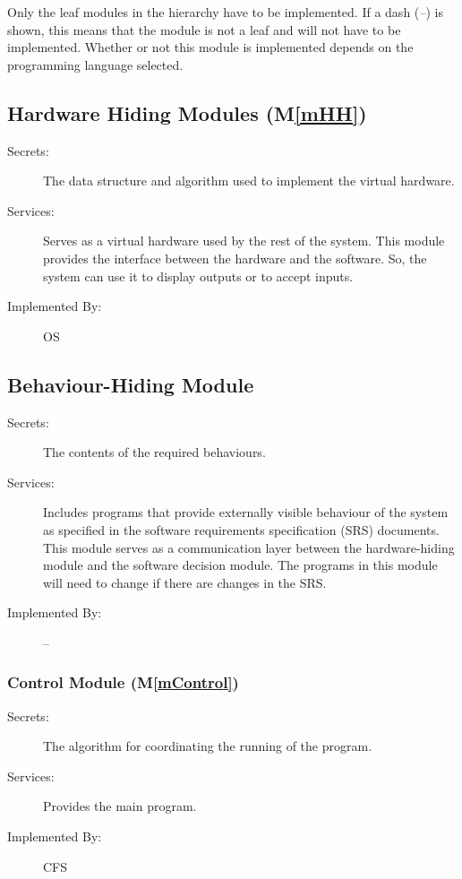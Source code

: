 \documentclass[12pt, titlepage]{article}
\newcommand{\mref}[1]{M\ref{#1}}
\newcommand{\famname}{CFS} %
\begin{document}
Only the leaf modules in the
hierarchy have to be implemented. If a dash (\emph{--}) is shown, this means
that the module is not a leaf and will not have to be implemented. Whether or
not this module is implemented depends on the programming language
selected.

\subsection{Hardware Hiding Modules (\mref{mHH})}

\begin{description}
\item[Secrets:]The data structure and algorithm used to implement the virtual
  hardware.
\item[Services:]Serves as a virtual hardware used by the rest of the
  system. This module provides the interface between the hardware and the
  software. So, the system can use it to display outputs or to accept inputs.
\item[Implemented By:] OS
\end{description}

\subsection{Behaviour-Hiding Module}

\begin{description}
\item[Secrets:]The contents of the required behaviours.
\item[Services:]Includes programs that provide externally visible behaviour of
  the system as specified in the software requirements specification (SRS)
  documents. This module serves as a communication layer between the
  hardware-hiding module and the software decision module. The programs in this
  module will need to change if there are changes in the SRS.
\item[Implemented By:] --
\end{description}
\subsubsection{Control Module (\mref{mControl})}

\begin{description}
	\item[Secrets:]The algorithm for coordinating the running of the program.
	\item[Services:] Provides the main program.
	\item[Implemented By:] \famname{}
\end{description}
\end{document}
